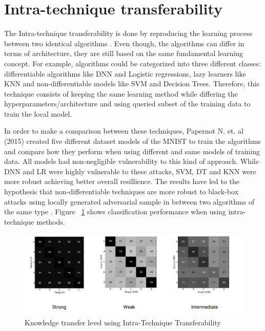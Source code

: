 \medskip



\section{Intra-technique transferability}

The Intra-technique transferability is done by reproducing the learning process between two identical algorithms \cite{papernot2016transf}. Even though, the algorithms can differ in terms of architecture, they are still based on the same fundamental learning concept. For example, algorithms could be categorized into three different classes: differentiable algorithms like DNN and Logistic regressions, lazy learners like KNN and non-differentiable models like SVM and Decision Trees. Therefore, this technique consists of keeping the same learning method while differing the hyperparameters/architecture and using queried subset of the training data to train the local model. 



In order to make a comparison between these techniques, Papernot N. et. al (2015) \cite{papernot2016transf} created five different dataset models of the MNIST to train the algorithms and compare how they perform when using different and same models of training data. All models had non-negligible vulnerability to this kind of approach. While DNN and LR were highly vulnerable to these attacks, SVM, DT and KNN were more robust achieving better overall resillience. The results have led to the hypothesis that non-differentiable techniques are more robust to black-box attacks using locally generated adversarial sample in between two algorithms of the same type \cite{papernot2016}. Figure ~\ref{fig:intra} shows classification performance when using intra-technique methods.

\begin{figure}[!h]
\centering
	\includegraphics[scale=0.6]{intra.png}
\caption{Knowledge transfer level using Intra-Technique Transferability \cite{papernot2016transf}}
\label{fig:intra}
\end{figure}



